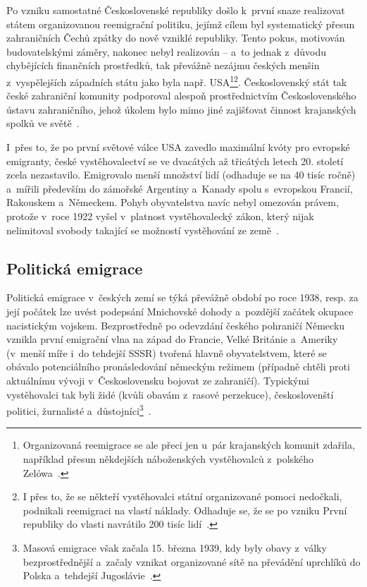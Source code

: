 Po vzniku samostatné Československé republiky došlo k~první snaze realizovat státem organizovanou reemigrační politiku, jejímž cílem byl systematický přesun zahraničních Čechů zpátky do nově vzniklé republiky. Tento pokus, motivován budovatelskými záměry, nakonec nebyl realizován -- a~to jednak z~důvodu chybějících finančních prostředků, tak převážně nezájmu českých menšin z~vyspělejších západních státu jako byla např. USA\footnote{Organizovaná reemigrace se ale přeci jen u~pár krajanských komunit zdařila, například přesun někdejších náboženských vystěhovalců z~polského Zelówa~\parencite{Nespor2005}.}\footnote{I přes to, že se někteří vystěhovalci státní organizované pomoci nedočkali, podnikali reemigraci na vlastí náklady. Odhaduje se, že se po vzniku První republiky do vlasti navrátilo 200 tisíc lidí~\parencite{Vaculik2009b}.}. Československý stát tak české zahraniční komunity podporoval alespoň prostřednictvím Československého ústavu zahraničního, jehož úkolem bylo mimo jiné zajišťovat činnost krajanských spolků ve světě~\parencite{Nespor2005}.

I~přes to, že po první světové válce USA zavedlo maximální kvóty pro evropské emigranty, české vystěhovalectví se ve dvacátých až třicátých letech 20. století zcela nezastavilo. Emigrovalo menší množství lidí (odhaduje se na 40 tisíc ročně) a~mířili především do zámořské Argentiny a~Kanady spolu s~evropskou Francií, Rakouskem a~Německem. Pohyb obyvatelstva navíc nebyl omezován právem, protože v~roce 1922 vyšel v~platnost vystěhovalecký zákon, který nijak nelimitoval svobody takající se možností vystěhování ze země~\parencite{Vaculik2009b}.

\hypertarget{politickuxe1-emigrace}{%
\subsection{Politická emigrace}\label{politickuxe1-emigrace}}

Politická emigrace v~českých zemí se týká převážně období po roce 1938, resp. za její počátek lze uvést podepsání Mnichovské dohody a~pozdější začátek okupace nacistickým vojskem. Bezprostředně po odevzdání českého pohraničí Německu vznikla první emigrační vlna na západ do Francie, Velké Británie a~Ameriky (v~menší míře i~do tehdejší SSSR) tvořená hlavně obyvatelstvem, které se obávalo potenciálního pronásledování německým režimem (případně chtěli proti aktuálnímu vývoji v~Československu bojovat ze zahraničí). Typickými vystěhovalci tak byli židé (kvůli obavám z~rasové perzekuce), českoslovenští politici, žurnalisté a~důstojníci\footnote{Masová emigrace však začala 15. března 1939, kdy byly obavy z~války bezprostřednější a~začaly vznikat organizované sítě na převádění uprchlíků do Polska a~tehdejší Jugoslávie~\parencite{Vaculik2002}.}~\parencite{Nespor2005}.

